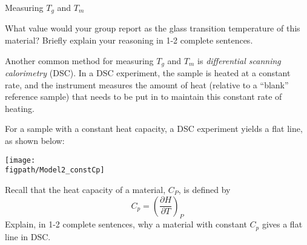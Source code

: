 \begin{activity}{Measuring $T_g$ and $T_m$}
\begin{ctqs}
		What value would your group report as the glass transition temperature of this material?  Briefly explain your reasoning in 1-2 complete sentences.
		
		\begin{solution}[1in]
		\end{solution}
	
\end{ctqs}

	
	



\begin{model}
	
	Another common method for measuring $T_g$ and $T_m$ is \emph{differential scanning calorimetry} (DSC).  In a DSC experiment, the sample is heated at a constant rate, and the instrument measures the amount of heat (relative to a ``blank'' reference sample) that needs to be put in to maintain this constant rate of heating.
	
	For a sample with a constant heat capacity, a DSC experiment yields a flat line, as shown below:
	
		\centerline{\texttt{[image: \\figpath/Model2\_constCp]}}
	
\end{model}

\begin{ctqs}

	\question Recall that the heat capacity of a material, $C_P$, is defined by
		\begin{equation*}
			C_p = \left(\frac{\partial H}{\partial T}\right)_P
		\end{equation*}
		Explain, in 1-2 complete sentences, why a material with constant $C_p$ gives a flat line in DSC.
		

\end{ctqs}
\end{activity}
